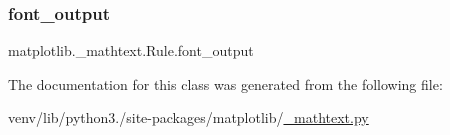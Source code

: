 \subsubsection{\texorpdfstring{font\+\_\+output}{font\_output}}
{\footnotesize\ttfamily matplotlib.\+\_\+mathtext.\+Rule.\+font\+\_\+output}



The documentation for this class was generated from the following file\+:\begin{DoxyCompactItemize}
\item 
venv/lib/python3./site-\/packages/matplotlib/\hyperlink{__mathtext_8py}{\+\_\+mathtext.\+py}\end{DoxyCompactItemize}

